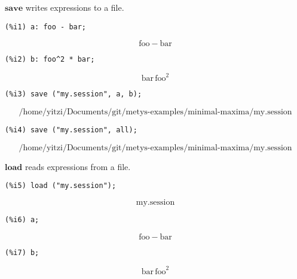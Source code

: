 \documentclass[12pt,leqno]{article}
\begin{document}
$\mathbf{save}$ writes expressions to a file.
\begin{verbatim}
(%i1) a: foo - bar;
\end{verbatim}
\begin{equation}
\mathrm{foo}-\mathrm{bar}\tag{\%o1}
\label{eq:doc-group1-code32-1-1}
\end{equation}
\begin{verbatim}
(%i2) b: foo^2 * bar;
\end{verbatim}
\begin{equation}
\mathrm{bar}\,\mathrm{foo}^2\tag{\%o2}
\label{eq:doc-group1-code32-2-1}
\end{equation}
\begin{verbatim}
(%i3) save ("my.session", a, b);
\end{verbatim}
\begin{equation}
\mbox{ /home/yitzi/Documents/git/metys-examples/minimal-maxima/my.session }\tag{\%o3}
\label{eq:doc-group1-code32-3-1}
\end{equation}
\begin{verbatim}
(%i4) save ("my.session", all);
\end{verbatim}
\begin{equation}
\mbox{ /home/yitzi/Documents/git/metys-examples/minimal-maxima/my.session }\tag{\%o4}
\label{eq:doc-group1-code32-4-1}
\end{equation}


$\mathbf{load}$ reads expressions from a file.
\begin{verbatim}
(%i5) load ("my.session");
\end{verbatim}
\begin{equation}
\mbox{ my.session }\tag{\%o5}
\label{eq:doc-group1-code33-1-1}
\end{equation}
\begin{verbatim}
(%i6) a;
\end{verbatim}
\begin{equation}
\mathrm{foo}-\mathrm{bar}\tag{\%o6}
\label{eq:doc-group1-code33-2-1}
\end{equation}
\begin{verbatim}
(%i7) b;
\end{verbatim}
\begin{equation}
\mathrm{bar}\,\mathrm{foo}^2\tag{\%o7}
\label{eq:doc-group1-code33-3-1}
\end{equation}
\end{document}

